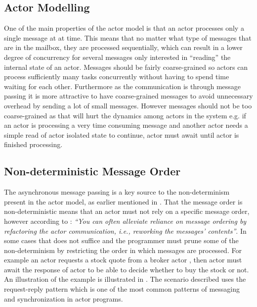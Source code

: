 \subsection{Actor Modelling}\label{ssec:actor_modelling}
One of the main properties of the actor model is that an actor processes only a single message at at time. This means that no matter what type of messages that are in the mailbox, they are processed sequentially, which can result in a lower degree of concurrency for several messages only interested in ``reading'' the internal state of an actor. Messages should be fairly coarse-grained so actors can process sufficiently many tasks concurrently without having to spend time waiting for each other\cite[p. 269]{karmani2009actor}. Furthermore as the communication is through message passing it is more attractive to have coarse-grained messages to avoid unnecessary overhead by sending a lot of small messages. However messages should not be too coarse-grained as that will hurt the dynamics among actors in the system e.g. if an actor  is processing a very time consuming message and another actor  needs a simple read of actor  isolated state to continue, actor  must await until actor  is finished processing.

\subsection{Non-deterministic Message Order}\label{ssec:nondeter_msg_order}
The asynchronous message passing is a key source to the non-determinism present in the actor model, as earlier mentioned in . That the message order is non-deterministic means that an actor must not rely on a specific message order, however according to \cite[p. 35]{haller2012actors}: \textit{``You can often alleviate reliance on message ordering by refactoring the actor communication, i.e., reworking the messages' contents''}. In some cases that does not suffice and the programmer must prune some of the non-determinism by restricting the order in which messages are processed. For example an actor  requests a stock quote from a broker actor , then actor  must await the response of actor  to be able to decide whether to buy the stock or not. An illustration of the example is illustrated in . The scenario described uses the request-reply pattern which is one of the most common patterns of messaging and synchronization in actor programs\cite[p. 5]{karmani2009actor}.

